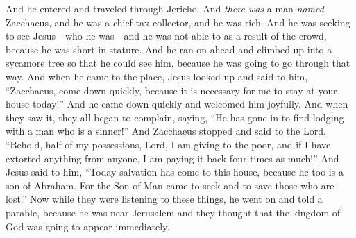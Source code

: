 \begin{biblechapter} %
 And he entered and traveled through Jericho.
\verse And \textit{there was} a man \textit{named} Zacchaeus, and he was a chief tax collector, and he was rich.
\verse And he was seeking to see Jesus—who he was—and he was not able to as a result of the crowd, because he was short in stature.
\verse And he ran on ahead and climbed up into a sycamore tree so that he could see him, because he was going to go through that way.
\verse And when he came to the place, Jesus looked up and said to him, “Zacchaeus, come down quickly, because it is necessary for me to stay at your house today!”
\verse And he came down quickly and welcomed him joyfully.
\verse And when they saw it, they all began to complain, saying, “He has gone in to find lodging with a man who is a sinner!”
\verse And Zacchaeus stopped and said to the Lord, “Behold, half of my possessions, Lord, I am giving to the poor, and if I have extorted anything from anyone, I am paying it back four times as much!”
\verse And Jesus said to him, “Today salvation has come to this house, because he too is a son of Abraham.
\verse For the Son of Man came to seek and to save those who are lost.”
 Now while they were listening to these things, he went on and told a parable, because he was near Jerusalem and they thought that the kingdom of God was going to appear immediately.

\end{biblechapter}
